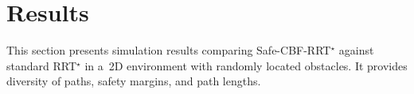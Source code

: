 \documentclass{svproc}
\begin{document}



\section{Results}
This section presents simulation results comparing Safe-CBF-RRT$^\star$ against standard
RRT$^\star$ in a~2D environment with randomly located obstacles. It provides
diversity of paths, safety margins, and path lengths.

\end{document}
